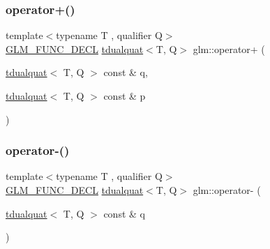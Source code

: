 \mbox{\label{group__gtx__dual__quaternion_ga55e10eaaabe1166be6314df62591c134}} 
\subsubsection{\texorpdfstring{operator+()}{operator+()}\hspace{0.1cm}{\footnotesize\ttfamily [2/2]}}
{\footnotesize\ttfamily template$<$typename T , qualifier Q$>$ \\
\mbox{\hyperlink{setup_8hpp_ab2d052de21a70539923e9bcbf6e83a51}{G\+L\+M\+\_\+\+F\+U\+N\+C\+\_\+\+D\+E\+CL}} \mbox{\hyperlink{structglm_1_1tdualquat}{tdualquat}}$<$T, Q$>$ glm\+::operator+ (\begin{DoxyParamCaption}\item[{\mbox{\hyperlink{structglm_1_1tdualquat}{tdualquat}}$<$ T, Q $>$ const \&}]{q,  }\item[{\mbox{\hyperlink{structglm_1_1tdualquat}{tdualquat}}$<$ T, Q $>$ const \&}]{p }\end{DoxyParamCaption})}

\mbox{\label{group__gtx__dual__quaternion_ga2245f8ea1b7c8a3fccfc92ca97ef03de}} 
\subsubsection{\texorpdfstring{operator-\/()}{operator-()}}
{\footnotesize\ttfamily template$<$typename T , qualifier Q$>$ \\
\mbox{\hyperlink{setup_8hpp_ab2d052de21a70539923e9bcbf6e83a51}{G\+L\+M\+\_\+\+F\+U\+N\+C\+\_\+\+D\+E\+CL}} \mbox{\hyperlink{structglm_1_1tdualquat}{tdualquat}}$<$T, Q$>$ glm\+::operator-\/ (\begin{DoxyParamCaption}\item[{\mbox{\hyperlink{structglm_1_1tdualquat}{tdualquat}}$<$ T, Q $>$ const \&}]{q }\end{DoxyParamCaption})}

